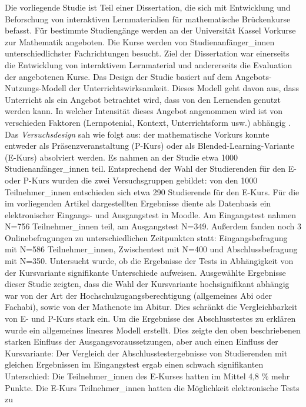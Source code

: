 Die vorliegende Studie ist Teil einer Dissertation, die sich mit
Entwicklung und Beforschung von interaktiven Lernmaterialien für
mathematische Brückenkurse befasst. Für bestimmte Studiengänge werden an
der Universität Kassel Vorkurse zur Mathematik angeboten. Die Kurse
werden von Studienanfänger\_innen unterschiedlichster Fachrichtungen
besucht. Ziel der Dissertation war einerseits die Entwicklung von
interaktivem Lernmaterial und andererseits die Evaluation der
angebotenen Kurse. Das Design der Studie basiert auf dem
Angebots-Nutzungs-Modell der Unterrichtswirksamkeit. Dieses Modell geht
davon aus, dass Unterricht als ein Angebot betrachtet wird, dass von den
Lernenden genutzt werden kann. In welcher Intensität dieses Angebot
angenommen wird ist von verschieden Faktoren (Lernpotenial, Kontext,
Unterrichtsform usw.) abhängig \parencite{Helmke2008}. Das
\emph{Versuchsdesign} sah wie folgt aus: der mathematische Vorkurs
konnte entweder als Präsenzveranstaltung (P-Kurs) oder als
Blended-Learning-Variante (E-Kurs) absolviert werden. Es nahmen an der
Studie etwa 1000 Studienanfänger\_innen teil. Entsprechend der Wahl der
Studierenden für den E- oder P-Kurs wurden die zwei Versuchsgruppen
gebildet: von den 1000 Teilnehmer\_innen entschieden sich etwa 290
Studierende für den E-Kurs. Für die im vorliegenden Artikel
dargestellten Ergebnisse diente als Datenbasis ein elektronischer
Eingangs- und Ausgangstest in Moodle. Am Eingangstest nahmen N=756
Teilnehmer\_innen teil, am Ausgangstest N=349. Außerdem fanden noch 3
Onlinebefragungen zu unterschiedlichen Zeitpunkten statt:
Eingangsbefragung mit N=586 Teilnehmer\_innen, Zwischentest mit N=400
und Abschlussbefragung mit N=350. Untersucht wurde, ob die Ergebnisse
der Tests in Abhängigkeit von der Kursvariante signifikante Unterschiede
aufweisen. Ausgewählte Ergebnisse dieser Studie zeigten, dass die Wahl
der Kursvariante hochsignifikant abhängig war von der Art der
Hochschulzugangsberechtigung (allgemeines Abi oder Fachabi), sowie von
der Mathenote im Abitur. Dies schränkt die Vergleichbarkeit von E- und
P-Kurs stark ein. Um die Ergebnisse des Abschlusstestes zu erklären
wurde ein allgemeines lineares Modell erstellt. Dies zeigte den oben
beschriebenen starken Einfluss der Ausgangsvoraussetzungen, aber auch
einen Einfluss der Kursvariante: Der Vergleich der
Abschlusstestergebnisse von Studierenden mit gleichen Ergebnissen im
Eingangstest ergab einen schwach signifikanten Unterschied: Die
Teilnehmer\_innen des E-Kurses hatten im Mittel 4,8 \% mehr Punkte. Die
E-Kurs Teilnehmer\_innen hatten die Möglichkeit elektronische Tests zu
